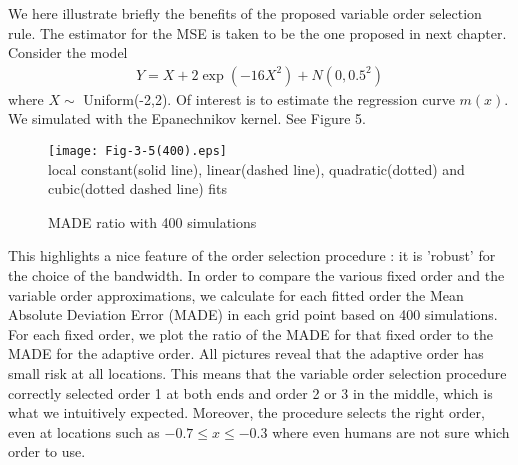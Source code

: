 \documentclass[12pt]{article}
\renewcommand{\=}[1]{\stackrel{#1}{=}} %
\theoremstyle{definition}
\begin{document}
	We here illustrate briefly the benefits of the proposed variable order selection rule. The estimator for the MSE is taken to be the one proposed in next chapter. Consider the model 
	\begin{align}
	Y=X +2\exp(-16X^2)+ N(0,0.5^2)
	\end{align}
	where $X\sim$ Uniform(-2,2). Of interest is to estimate the regression curve $m(x)$. We simulated with the Epanechnikov kernel. See Figure 5.
	\begin{figure}
		\caption{MADE ratio with 400 simulations}
		\centering
		\texttt{[image: Fig-3-5(400).eps]}
		\\local constant(solid line), linear(dashed line), quadratic(dotted) and cubic(dotted dashed line) fits
	\end{figure}
	This highlights a nice feature of the order selection procedure : it is 'robust' for the choice of the bandwidth. In order to compare the various fixed order and the variable order approximations, we calculate for each fitted order the Mean Absolute Deviation Error (MADE) in each grid point based on 400 simulations. For each fixed order, we plot the ratio of the MADE for that fixed order to the MADE for the adaptive order. All pictures reveal that the adaptive order has small risk at all locations. This means that the variable order selection procedure correctly selected order 1 at both ends and order 2 or 3 in the middle, which is what we intuitively expected. Moreover, the procedure selects the right order, even at locations such as $-0.7 \leq x\leq-0.3$ where even humans are not sure which order to use. 
%
\end{document}
